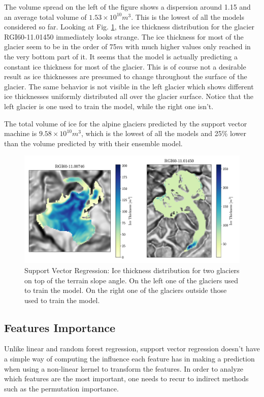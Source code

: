 The volume spread on the left of the figure shows a dispersion around 1.15 and an average total volume of $1.53 \times 10^{10}m^3$. This is the lowest of all the models considered so far. 
Looking at Fig. \ref{fig:svr-map}, the ice thickness distribution for the glacier RGI60-11.01450 immediately looks strange. The ice thickness for most of the glacier seem to be in the order of 75$m$ with much higher values only reached in the very bottom part of it. It seems that the model is actually predicting a constant ice thickness for most of the glacier. This is of course not a desirable result as ice thicknesses are presumed to change throughout the surface of the glacier. The same behavior is not visible in the left glacier which shows different ice thicknesses uniformly distributed all over the glacier surface. Notice that the left glacier is one used to train the model, while the right one isn't.

The total volume of ice for the alpine glaciers predicted by the support vector machine is $9.58 \times 10^{10}m^3$, which is the lowest of all the models and 25\% lower than the volume predicted by \citet{Farinotti2019} with their ensemble model.

\begin{figure}[!tp]
	\centering		  
	\includegraphics[width=1.\textwidth]{figures/SVR_thick_map.pdf}
	\caption{Support Vector Regression: Ice thickness distribution for two glaciers on top of the terrain slope angle. On the left one of the glaciers used to train the model. On the right one of the glaciers outside those used to train the model.}
	\label{fig:svr-map}
\end{figure}

\subsection{Features Importance}\label{svr-features}
Unlike linear and random forest regression, support vector regression doesn't have a simple way of computing the influence each feature has in making a prediction when using a non-linear kernel to transform the features. In order to analyze which features are the most important, one needs to recur to indirect methods such as the permutation importance.

